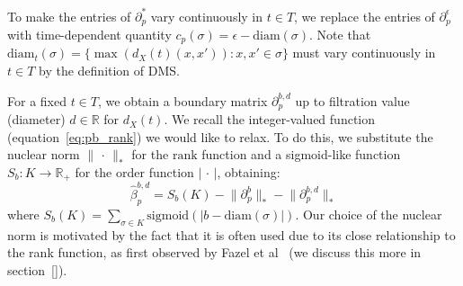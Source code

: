 \documentclass[10pt]{article}
\begin{document}
To make the entries of  $\partial_p^\ast$ vary continuously in $t \in T$, we replace the entries of $\partial_p^\epsilon$ with time-dependent quantity $c_p(\sigma) = \epsilon - \mathrm{diam}(\sigma)$. 
Note that $\mathrm{diam}_t(\sigma) = \{ \max(d_X(t)(x, x')) : x,x' \in \sigma\}$ must vary continuously in $t \in T$ by the definition of DMS.

For a fixed $t \in T$, we obtain a boundary matrix $\partial_{p}^{b,d}$ up to filtration value (diameter) $d \in \mathbb{R}$ for $d_X(t)$. We recall the integer-valued function (equation~\eqref{eq:pb_rank}) we would like to relax. To do this, we substitute the nuclear norm $\lVert \, \cdot \, \rVert_\ast$  for the $\mathrm{rank}$ function and a sigmoid-like function $S_b : K \to \mathbb{R}_{+}$ for the order function $\lvert \, \cdot \, \rvert$, obtaining: 
\begin{equation}\label{eq:relaxation_pb}
\hat{\beta}_p^{b,d} = S_b(K) - \lVert \partial_p^b \rVert_{\ast} - \lVert \partial_p^{b,d} \rVert_\ast
\end{equation} 
where $S_b(K) = \sum_{\sigma \in K} \mathrm{sigmoid}(\lvert b - \mathrm{diam}(\sigma)\rvert)$.
Our choice of the nuclear norm is motivated by the fact that it is often used due to its close relationship to the rank function, as first observed by Fazel et al~\cite{} (we discuss this more in section~\ref{}). 
\end{document}

